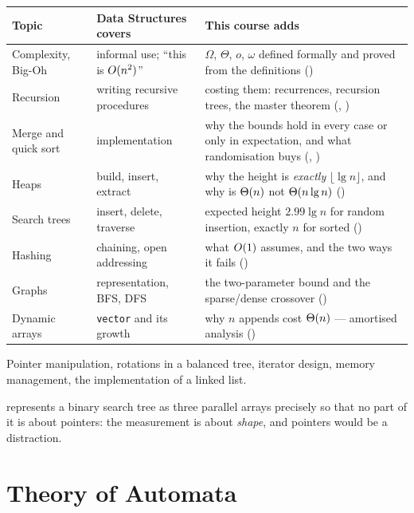 \begin{longtable}{@{}L{3.4cm}L{5.2cm}L{5.9cm}@{}}
\toprule
{}
\textbf{Topic} & \textbf{Data Structures covers} & \textbf{This course adds} \\
\midrule
\endhead
Complexity, Big-Oh & informal use; ``this is $O(n^{2})$'' &
  $\Omega$, $\Theta$, $o$, $\omega$ defined formally and proved from the
  definitions () \\
Recursion & writing recursive procedures &
  costing them: recurrences, recursion trees, the master theorem
  (, ) \\
Merge and quick sort & implementation &
  why the bounds hold in every case or only in expectation, and what
  randomisation buys (, ) \\
Heaps & build, insert, extract &
  why the height is \emph{exactly} $\lfloor \lg n \rfloor$, and why
   is $\Theta(n)$ not $\Theta(n\operatorname{lg} n)$
  () \\
Search trees & insert, delete, traverse &
  expected height $2.99\lg n$ for random insertion, exactly $n$ for sorted
  () \\
Hashing & chaining, open addressing &
  what $O(1)$ assumes, and the two ways it fails () \\
Graphs & representation, BFS, DFS &
  the two-parameter bound and the sparse/dense crossover () \\
Dynamic arrays & \texttt{vector} and its growth &
  why $n$ appends cost $\Theta(n)$ --- amortised analysis
  () \\
\bottomrule
\end{longtable}

\begin{alertbox}
Pointer manipulation, rotations in a balanced tree, iterator design, memory
management, the implementation of a linked list.

\smallskip
{} represents a binary search tree as three parallel arrays
precisely so that no part of it is about pointers: the measurement is about
\emph{shape}, and pointers would be a distraction.
\end{alertbox}

\section{Theory of Automata}


